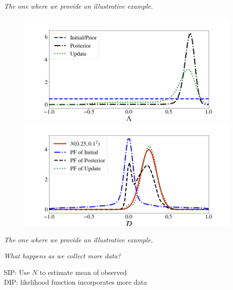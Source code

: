 \begin{frame}{\it The one where we provide an illustrative example.}

\begin{figure}
\centering
   \includegraphics[width=0.65\linewidth]{figures/bip-vs-sip-1.png}
   \includegraphics[width=0.65\linewidth]{figures/bip-vs-sip-pf-1.png}
 \label{fig:bayes-comparison}
\end{figure}

\end{frame}


\begin{frame}{\it The one where we provide an illustrative example.}

\centering
\emph{What happens as we collect more data?}
\bigskip

SIP: Use $N$ to estimate mean of observed \\
DIP: likelihood function incorporates more data

\end{frame}

